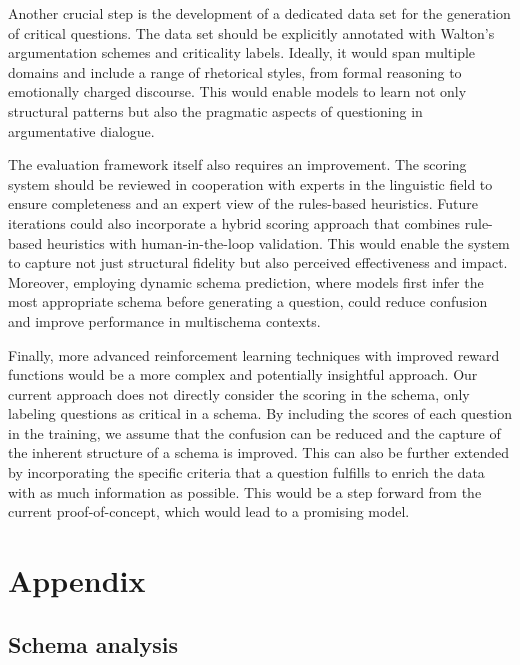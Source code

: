 \documentclass[11pt]{article}
\begin{document}
Another crucial step is the development of a dedicated data set for the generation of critical questions. The data set should be explicitly annotated with Walton's argumentation schemes and criticality labels. Ideally, it would span multiple domains and include a range of rhetorical styles, from formal reasoning to emotionally charged discourse. This would enable models to learn not only structural patterns but also the pragmatic aspects of questioning in argumentative dialogue.

The evaluation framework itself also requires an improvement. The scoring system should be reviewed in cooperation with experts in the linguistic field to ensure completeness and an expert view of the rules-based heuristics. Future iterations could also incorporate a hybrid scoring approach that combines rule-based heuristics with human-in-the-loop validation. This would enable the system to capture not just structural fidelity but also perceived effectiveness and impact. Moreover, employing dynamic schema prediction, where models first infer the most appropriate schema before generating a question, could reduce confusion and improve performance in multischema contexts.

Finally, more advanced reinforcement learning techniques with improved reward functions would be a more complex and potentially insightful approach. Our current approach does not directly consider the scoring in the schema, only labeling questions as critical in a schema. By including the scores of each question in the training, we assume that the confusion can be reduced and the capture of the inherent structure of a schema is improved. This can also be further extended by incorporating the specific criteria that a question fulfills to enrich the data with as much information as possible. This would be a step forward from the current proof-of-concept, which would lead to a promising model. 

\newpage



\appendix
\onecolumn
\section{Appendix}
\label{sec:appendix}
\subsection{Schema analysis}
\label{sec: appendix schema analysis}
\end{document}
